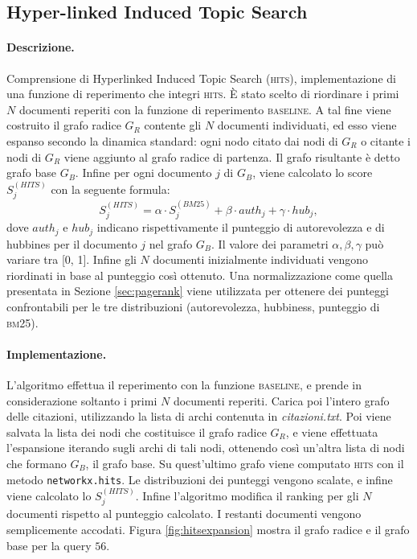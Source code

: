 \subsection{Hyper-linked Induced Topic Search}
\label{sec:hits}

\paragraph{\textbf{Descrizione.}}
Comprensione di Hyperlinked Induced Topic Search (\textsc{hits}), implementazione di una funzione di reperimento che integri \textsc{hits}. \`E stato scelto di riordinare i primi $N$ documenti reperiti con la funzione di reperimento \textsc{baseline}. A tal fine viene costruito il grafo radice $G_R$ contente gli $N$ documenti individuati, ed esso viene espanso secondo la dinamica standard: ogni nodo citato dai nodi di $G_R$ o citante i nodi di $G_R$ viene aggiunto al grafo radice di partenza. Il grafo risultante \`e detto grafo base $G_B$. Infine per ogni documento $j$ di $G_B$, viene calcolato lo score $S^{(HITS)}_{j}$ con la seguente formula:
\[ S^{(HITS)}_j =  \alpha \cdot S^{(BM25)}_j + \beta \cdot auth_j + \gamma \cdot hub_j,\]
dove $auth_j$ e $hub_j$ indicano rispettivamente il punteggio di autorevolezza e di hubbines per il documento $j$ nel grafo $G_B$. Il valore dei parametri $\alpha, \beta, \gamma$ pu\`o variare tra [0, 1]. Infine gli $N$ documenti inizialmente individuati vengono riordinati in base al punteggio cos\`i ottenuto. Una normalizzazione come quella presentata in Sezione \ref{sec:pagerank} viene utilizzata per ottenere dei punteggi confrontabili per le tre distribuzioni (autorevolezza, hubbiness, punteggio di \textsc{bm25}).
\paragraph{\textbf{Implementazione.}}
L'algoritmo effettua il reperimento con la funzione \textsc{baseline}, e prende in considerazione soltanto i primi $N$ documenti reperiti. Carica poi l'intero grafo delle citazioni, utilizzando la lista di archi contenuta in \textit{citazioni.txt}. Poi viene salvata la lista dei nodi che costituisce il grafo radice $G_R$, e viene effettuata l'espansione iterando sugli archi di tali nodi, ottenendo cos\`i un'altra lista di nodi che formano $G_B$, il grafo base. Su quest'ultimo grafo viene computato \textsc{hits} con il metodo \texttt{networkx.hits}. Le distribuzioni dei punteggi vengono scalate, e infine viene calcolato lo $S^{(HITS)}_j$. Infine l'algoritmo modifica il ranking per gli $N$ documenti rispetto al punteggio calcolato. I restanti documenti vengono semplicemente accodati. Figura \ref{fig:hitsexpansion} mostra il grafo radice e il grafo base per la query $56$.

